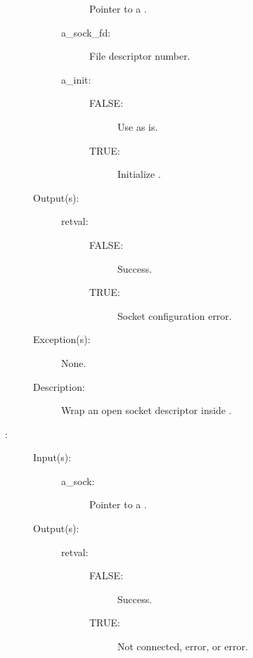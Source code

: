 \begin{description}
\begin{description}
\begin{description}
			Pointer to a .
		\item[a\_sock\_fd: ]
			File descriptor number.
		\item[a\_init: ]
			\begin{description}\item[]
			\item[FALSE: ] Use  as is.
			\item[TRUE: ] Initialize .
			\end{description}
		\end{description}
	\item[Output(s): ]
		\begin{description}\item[]
		\item[retval: ]
			\begin{description}\item[]
			\item[FALSE: ] Success.
			\item[TRUE: ] Socket configuration error.
			\end{description}
		\end{description}
	\item[Exception(s): ] None.
	\item[Description: ]
		Wrap an open socket descriptor inside .
	\end{description}
\label{sock_disconnect}
\item[{\cfunc[cw\_bool\_t]{sock\_disconnect}{cw\_sock\_t *a\_sock}}: ]
	\begin{description}\item[]
	\item[Input(s): ]
		\begin{description}\item[]
		\item[a\_sock: ]
			Pointer to a .
		\end{description}
	\item[Output(s): ]
		\begin{description}\item[]
		\item[retval: ]
			\begin{description}\item[]
			\item[FALSE: ]
				Success.
			\item[TRUE: ]
				Not connected,  error, or
				 error.
			\end{description}

\end{description}
\end{description}
\end{description}
